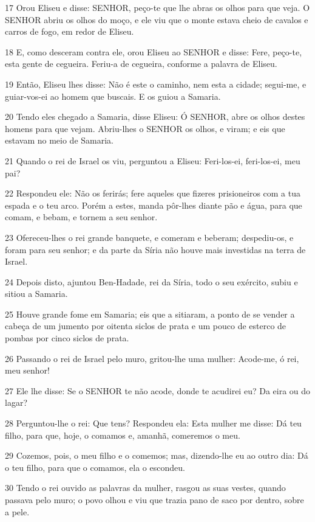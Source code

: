 \par 17 Orou Eliseu e disse: SENHOR, peço-te que lhe abras os olhos para que veja. O SENHOR abriu os olhos do moço, e ele viu que o monte estava cheio de cavalos e carros de fogo, em redor de Eliseu.
\par 18 E, como desceram contra ele, orou Eliseu ao SENHOR e disse: Fere, peço-te, esta gente de cegueira. Feriu-a de cegueira, conforme a palavra de Eliseu.
\par 19 Então, Eliseu lhes disse: Não é este o caminho, nem esta a cidade; segui-me, e guiar-vos-ei ao homem que buscais. E os guiou a Samaria.
\par 20 Tendo eles chegado a Samaria, disse Eliseu: Ó SENHOR, abre os olhos destes homens para que vejam. Abriu-lhes o SENHOR os olhos, e viram; e eis que estavam no meio de Samaria.
\par 21 Quando o rei de Israel os viu, perguntou a Eliseu: Feri-los-ei, feri-los-ei, meu pai?
\par 22 Respondeu ele: Não os ferirás; fere aqueles que fizeres prisioneiros com a tua espada e o teu arco. Porém a estes, manda pôr-lhes diante pão e água, para que comam, e bebam, e tornem a seu senhor.
\par 23 Ofereceu-lhes o rei grande banquete, e comeram e beberam; despediu-os, e foram para seu senhor; e da parte da Síria não houve mais investidas na terra de Israel.
\par 24 Depois disto, ajuntou Ben-Hadade, rei da Síria, todo o seu exército, subiu e sitiou a Samaria.
\par 25 Houve grande fome em Samaria; eis que a sitiaram, a ponto de se vender a cabeça de um jumento por oitenta siclos de prata e um pouco de esterco de pombas por cinco siclos de prata.
\par 26 Passando o rei de Israel pelo muro, gritou-lhe uma mulher: Acode-me, ó rei, meu senhor!
\par 27 Ele lhe disse: Se o SENHOR te não acode, donde te acudirei eu? Da eira ou do lagar?
\par 28 Perguntou-lhe o rei: Que tens? Respondeu ela: Esta mulher me disse: Dá teu filho, para que, hoje, o comamos e, amanhã, comeremos o meu.
\par 29 Cozemos, pois, o meu filho e o comemos; mas, dizendo-lhe eu ao outro dia: Dá o teu filho, para que o comamos, ela o escondeu.
\par 30 Tendo o rei ouvido as palavras da mulher, rasgou as suas vestes, quando passava pelo muro; o povo olhou e viu que trazia pano de saco por dentro, sobre a pele.

